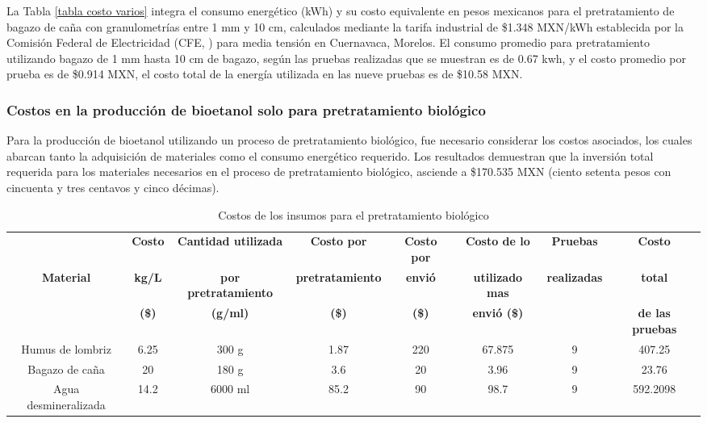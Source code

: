 \documentclass[12pt]{article}
\begin{document}
La Tabla \ref{tabla costo varios} integra el consumo energético (kWh) y su costo equivalente en pesos mexicanos para el pretratamiento de bagazo de caña con granulometrías entre 1 mm y 10 cm, calculados mediante la tarifa industrial de \$1.348 MXN/kWh establecida por la Comisión Federal de Electricidad (CFE, \cite{CFE2023}) para media tensión en Cuernavaca, Morelos. El consumo promedio para pretratamiento utilizando bagazo de 1 mm hasta 10 cm de bagazo, según las pruebas realizadas que se muestran es de 0.67 kwh, y el costo promedio por prueba es de \$0.914 MXN, el costo total de la energía utilizada en las nueve pruebas es de \$10.58 MXN.




	 \subsubsection{Costos en la producción de bioetanol solo para pretratamiento biológico}
			
			
Para la producción de bioetanol utilizando un proceso de pretratamiento biológico, fue necesario considerar los costos asociados, los cuales abarcan tanto la adquisición de materiales como el consumo energético requerido. Los resultados demuestran que la inversión total requerida para los materiales necesarios en el proceso de pretratamiento biológico, asciende a \$170.535 MXN (ciento setenta pesos con cincuenta y tres centavos y cinco décimas).
		\begin{table}[H]
		\centering
		\caption{Costos de los insumos para el pretratamiento biológico}
		\label{Costo para pretratamiento biologico}
		\resizebox{16cm}{!} {
			\begin{tabular}{|c|c|c|c|c|c|c|c|}
				\hline
				& \textbf{Costo}& \textbf{Cantidad utilizada } &\textbf{Costo por }  &\textbf{Costo por }  & \textbf{Costo de lo }  &\textbf{Pruebas} & \textbf{Costo } \\
				\textbf{Material}&	\textbf{kg/L} & 	\textbf{por pretratamiento} & \textbf{pretratamiento} & \textbf{envió} & \textbf{utilizado mas }  & \textbf{realizadas } & \textbf{total }  \\
				& 	\textbf{(\$)}	& \textbf{(g/ml)} &\textbf{(\$)} &\textbf{(\$)}  & \textbf{envió (\$)} & & \textbf{de las pruebas}\\ \hline		
				Humus de lombriz    &6.25& 300 g & 1.87& 220 & 67.875& 9 & 407.25\\ \hline
				Bagazo de caña 	    &20  & 180 g  &3.6  & 20 & 3.96 & 9  &23.76\\ \hline
				Agua desmineralizada&14.2& 6000 ml& 85.2 & 90 & 98.7 & 9 & 592.2098  \\ \hline
		\end{tabular} }

	\end{table}
	
\end{document}
